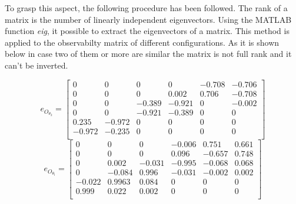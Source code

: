 To grasp this aspect, the following procedure has been followed. The rank of a matrix is the number of linearly independent eigenvectors.
\label{SVD_explaination}
Using the MATLAB function \textit{eig}, it possible to extract the eigenvectors of a matrix. This method is applied to the observabilty matrix of different configurations. As it is shown below in case two of them or more are similar the matrix is not full rank and it can't be inverted. 

\begin{equation}
	e_{O_{\theta_{2}}}= \begin{bmatrix}
		0& 0 & 0 & 0 		& -0.708 & -0.706 \\
		0& 0 & 0 & 0.002 &  0.706 & -0.708 \\
		0& 0 & -0.389 & -0.921 & 0 & -0.002 \\
		0& 0 & -0.921 & -0.389 & 0 & 0 \\
		0.235 & -0.972 & 0 & 0 & 0 & 0 \\
		-0.972 & -0.235 & 0 & 0 & 0 & 0 \\
	\end{bmatrix}
\end{equation}
\begin{equation}
	e_{O_{\theta_{l}}}= \begin{bmatrix}
		0& 0 & 0 & -0.006  & 0.751 & 0.661 \\
		0& 0 & 0 & 0.096 &  -0.657 & 0.748 \\
		0& 0.002 & -0.031 & -0.995 & -0.068 & 0.068 \\
		0& -0.084 & 0.996 & -0.031 & -0.002& 0.002 \\
		-0.022 & 0.9963 & 0.084 & 0 & 0 & 0 \\
		0.999 & 0.022 & 0.002 & 0 & 0 & 0 \\
	\end{bmatrix}
\end{equation}
